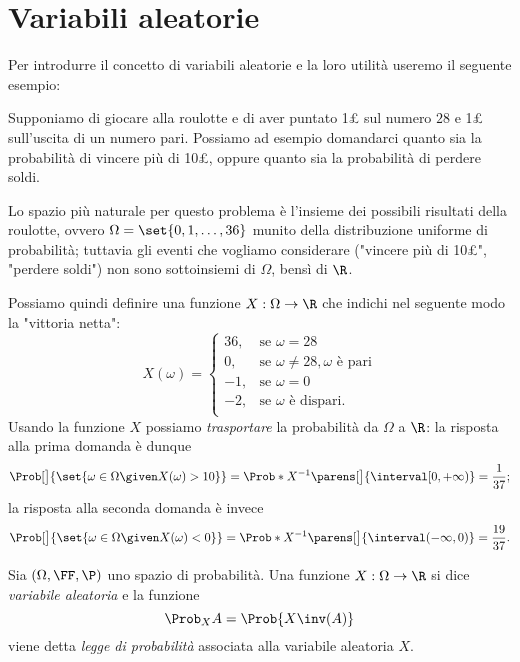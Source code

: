 \section{Variabili aleatorie}

Per introdurre il concetto di variabili aleatorie e la loro utilità useremo il seguente esempio:
\begin{example}
    Supponiamo di giocare alla roulotte e di aver puntato 1£ sul numero $28$ e 1£ sull'uscita di un numero pari. Possiamo ad esempio domandarci quanto sia la probabilità di vincere più di 10£, oppure quanto sia la probabilità di perdere soldi.

    Lo spazio più naturale per questo problema è l'insieme dei possibili risultati della roulotte, ovvero $\Omega = \set{0, 1, \dots, 36}$ munito della distribuzione uniforme di probabilità; tuttavia gli eventi che vogliamo considerare ("vincere più di 10£", "perdere soldi") non sono sottoinsiemi di $\Omega$, bensì di $\R$.
    
    Possiamo quindi definire una funzione $X : \Omega \to \R$ che indichi nel seguente modo la "vittoria netta": \[
        X(\omega) = \begin{cases}
            36, &\text{se } \omega = 28\\
            0, &\text{se } \omega \neq 28, \omega \text{ è pari}\\
            -1, &\text{se } \omega = 0\\
            -2, &\text{se } \omega \text{ è dispari}.\\
        \end{cases}  
    \]
    Usando la funzione $X$ possiamo \emph{trasportare} la probabilità da $\Omega$ a $\R$: la risposta alla prima domanda è dunque \[
        \Prob[\big]{\set{\omega \in \Omega \given X(\omega) > 10}} 
        = \Prob*{X^{-1}\parens[\big]{\interval[{0, +\infty})}} 
        = \frac{1}{37};    
    \] la risposta alla seconda domanda è invece \[
        \Prob[\big]{\set{\omega \in \Omega \given X(\omega) < 0}} 
        = \Prob*{X^{-1}\parens[\big]{\interval({-\infty, 0})}} 
        = \frac{19}{37}.    
    \]
\end{example}

\begin{definition}
     Sia $(\Omega, \FF, \P)$ uno spazio di probabilità. Una funzione $X : \Omega \to \R$ si dice \emph{variabile aleatoria} e la funzione \[
        \Prob_{X}{A} = \Prob{X\inv(A)}  
    \] viene detta \emph{legge di probabilità} associata alla variabile aleatoria $X$.
\end{definition}

